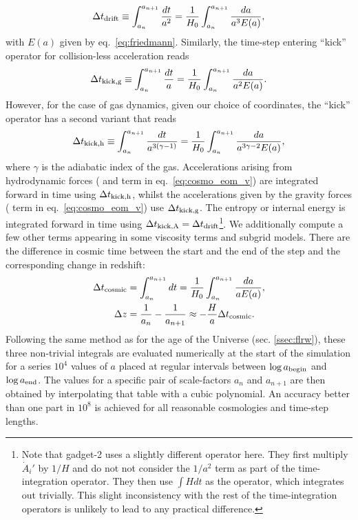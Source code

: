 \begin{equation}
  \Delta t_{\rm drift} \equiv \int_{a_n}^{a_{n+1}} \frac{dt}{a^2} = \frac{1}{H_0} \int_{a_n}^{a_{n+1}} \frac{da}{a^3E(a)},
\end{equation}
with $E(a)$ given by eq.~\ref{eq:friedmann}. Similarly, the time-step
entering ``kick'' operator for collision-less acceleration reads
\begin{equation}
  \Delta t_{\rm kick,g} \equiv \int_{a_n}^{a_{n+1}} \frac{dt}{a} = \frac{1}{H_0} \int_{a_n}^{a_{n+1}} \frac{da}{a^2E(a)}.
\end{equation}
However, for the case of gas dynamics, given our choice of
coordinates, the ``kick'' operator has a second variant that reads
\begin{equation}
  \Delta t_{\rm kick,h} \equiv \int_{a_n}^{a_{n+1}} \frac{dt}{a^{3(\gamma-1)}} = \frac{1}{H_0} \int_{a_n}^{a_{n+1}} \frac{da}{a^{3\gamma - 2}E(a)},
\end{equation}
where $\gamma$ is the adiabatic index of the gas.  Accelerations
arising from hydrodynamic forces ( and  term in
eq.~\ref{eq:cosmo_eom_v}) are integrated forward in time using $\Delta
t_{\rm kick,h}$, whilst the accelerations given by the gravity forces
( term in eq.~\ref{eq:cosmo_eom_v}) use $\Delta t_{\rm
  kick,g}$. The entropy or internal energy is integrated forward in
time using $\Delta t_{\rm kick,A} = \Delta t_{\rm
  drift}$\footnote{Note that {\sc gadget-2} uses a slightly different
  operator here. They first multiply $\dot{A}_i'$ by $1/H$ and do not
  not consider the $1/a^2$ term as part of the time-integration
  operator. They then use $\int H dt$ as the operator, which
  integrates out trivially. This slight inconsistency with the rest of
  the time-integration operators is unlikely to lead to any practical
  difference.}. We additionally compute a few other terms
appearing in some viscosity terms and subgrid models. There are the
difference in cosmic time between the start and the end of the step
and the corresponding change in redshift:
\begin{align}
  \Delta t_{\rm cosmic} &= \int_{a_n}^{a_{n+1}} dt = \frac{1}{H_0}
  \int_{a_n}^{a_{n+1}} \frac{da}{a E(a)},\\
  \Delta z &= \frac{1}{a_n} - \frac{1}{a_{n+1}} \approx -\frac{H}{a} \Delta t_{\rm cosmic}.
\end{align}
Following the same method as for the age of the Universe
(sec. \ref{ssec:flrw}), these three non-trivial integrals are evaluated
numerically at the start of the simulation for a series $10^4$ values of
$a$ placed at regular intervals between $\log a_{\rm begin}$ and
$\log a_{\rm end}$. The values for a specific pair of scale-factors $a_n$
and $a_{n+1}$ are then obtained by interpolating that table with a cubic
polynomial. An accuracy better than one part in $10^8$ is achieved for all
reasonable cosmologies and time-step lengths.


